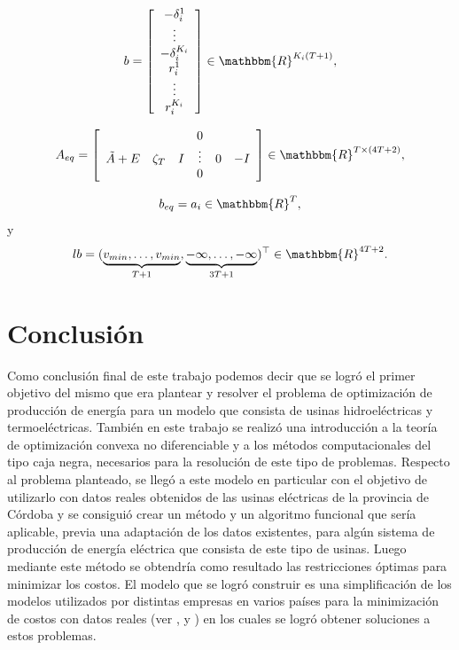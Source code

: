 \documentclass[a4paper,12pt]{report}
\newcommand{\RR}{\mathbbm{R}}
\begin{document}
$$b=\left[\begin{array}{c} -\delta_i^1\\ \vdots\\-\delta_i^{K_i} \\r_i^1 \\ \vdots\\ r_i^{K_i}\end{array}\right]\in\RR^{K_i(T+1)},$$

$$A_{eq}=\left[
\begin{array}{cccccc}
& & & 0 & & \\
\tilde{A}+E&\zeta_T&I&\vdots&0&-I\\
& & & 0 & & 
\end{array}
\right]\in\RR^{T\times (4T+2)},$$


$$b_{eq}=a_i\in\RR^T,$$
 y $$lb=(\underbrace{v_{min},\ldots,v_{min}}_{T+1},\underbrace{-\infty,\ldots,-\infty}_{3T+1})^\top\in\RR^{4T+2}.$$

\chapter*{Conclusi\'on}

Como conclusi\'on final de este trabajo podemos decir que se logr\'o el primer objetivo del mismo que era plantear y resolver el problema de optimizaci\'on de producci\'on de energ\'ia para un modelo que consista de usinas hidroel\'ectricas y termoel\'ectricas. Tambi\'en en este trabajo se realiz\'o una introducci\'on a la teor\'ia de optimizaci\'on convexa no diferenciable y a los m\'etodos computacionales del tipo caja negra, necesarios para la resoluci\'on de este tipo de problemas. Respecto al problema planteado, se lleg\'o  a este modelo en particular con el objetivo de utilizarlo con datos reales obtenidos de las usinas el\'ectricas de la provincia de C\'ordoba y se consigui\'o crear un m\'etodo y un algoritmo funcional que ser\'ia aplicable, previa una adaptaci\'on de los datos existentes, para alg\'un sistema de producci\'on de energ\'ia el\'ectrica que consista de este tipo de usinas. Luego mediante este m\'etodo se obtendr\'ia como resultado las restricciones \'optimas para minimizar los costos. El modelo que se logr\'o construir es una simplificaci\'on de los modelos utilizados por distintas empresas en varios pa\'ises para la minimizaci\'on de costos con datos reales (ver \cite{BelSouPinSag:03}, \cite{blondel1991} y \cite{gollmer2000unit}) en los cuales se logr\'o obtener soluciones a estos problemas.
\end{document}
